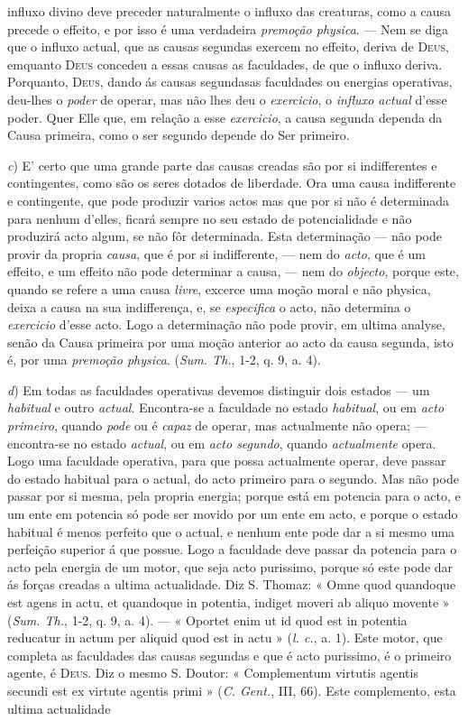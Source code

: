 influxo divino deve preceder naturalmente o influxo das creaturas, como a causa precede o effeito, e por isso é uma verdadeira \emph{premoção physica}. --- Nem se diga que o influxo actual, que as causas segundas exercem no effeito, deriva de \textsc{Deus}, emquanto \textsc{Deus} concedeu a essas causas as faculdades, de que o influxo deriva. Porquanto, \textsc{Deus}, dando ás causas segundasas faculdades ou energias operativas, deu-lhes o \emph{poder} de operar, mas não lhes deu o \emph{exercicio}, o \emph{influxo actual} d'esse poder. Quer Elle que, em relação a esse \emph{exercicio}, a causa segunda dependa da Causa primeira, como o ser segundo depende do Ser primeiro.\par \emph{c}) E' certo que uma grande parte das causas creadas são por si indifferentes e contingentes, como são os seres dotados de liberdade. Ora uma causa indifferente e contingente, que pode produzir varios actos mas que por si não é determinada para nenhum d'elles, ficará sempre no seu estado de potencialidade e não produzirá acto algum, se não fôr determinada. Esta determinação --- não pode provir da propria \emph{causa}, que é por si indifferente, --- nem do \emph{acto}, que é um effeito, e um effeito não pode determinar a causa, --- nem do \emph{objecto}, porque este, quando se refere a uma causa \emph{livre}, excerce uma moção moral e não physica, deixa a causa na sua indifferença, e, se \emph{especifica} o acto, não determina o \emph{exercicio} d'esse acto. Logo a determinação não pode provir, em ultima analyse, senão da Causa primeira por uma moção anterior ao acto da causa segunda, isto é, por uma \emph{premoção physica}. (\emph{Sum. Th.}, 1-2, q. 9, a. 4).\par \emph{d}) Em todas as faculdades operativas devemos distinguir dois estados --- um \emph{habitual} e outro \emph{actual}. Encontra-se a faculdade no estado \emph{habitual}, ou em \emph{acto primeiro}, quando \emph{pode} ou é \emph{capaz} de operar, mas actualmente não opera; --- encontra-se no estado \emph{actual}, ou em \emph{acto segundo}, quando \emph{actualmente} opera. Logo uma faculdade operativa, para que possa actualmente operar, deve passar do estado habitual para o actual, do acto primeiro para o segundo. Mas não pode passar por si mesma, pela propria energia; porque está em potencia para o acto, e um ente em potencia só pode ser movido por um ente em acto, e porque o estado habitual é menos perfeito que o actual, e nenhum ente pode dar a si mesmo uma perfeição superior á que possue. Logo a faculdade deve passar da potencia para o acto pela energia de um motor, que seja acto purissimo, porque só este pode dar ás forças creadas a ultima actualidade. Diz S. Thomaz: « Omne quod quandoque est agens in actu, et quandoque in potentia, indiget moveri ab aliquo movente » (\emph{Sum. Th.}, 1-2, q. 9, a. 4). --- « Oportet enim ut id quod est in potentia reducatur in actum per aliquid quod est in actu » (\emph{l. c.}, a. 1). Este motor, que completa as faculdades das causas segundas e que é acto purissimo, é o primeiro agente, é \textsc{Deus}. Diz o mesmo S. Doutor: « Complementum virtutis agentis secundi est ex virtute agentis primi » (\emph{C. Gent.}, III, 66). Este complemento, esta ultima actualidade 